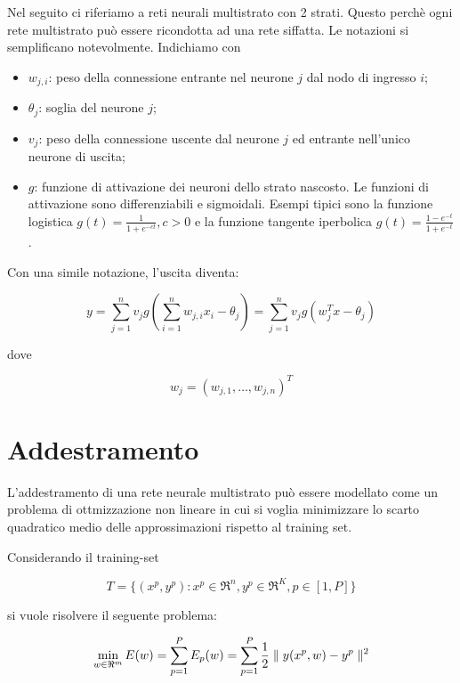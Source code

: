 Nel seguito ci riferiamo a reti neurali multistrato con 2 strati. Questo perchè ogni rete multistrato può essere ricondotta ad una rete siffatta. Le notazioni si semplificano notevolmente. Indichiamo con
\begin{itemize}
  \item $w_{j,i}$: peso della connessione entrante nel neurone $j$ dal nodo di ingresso $i$;
  \item $\theta_{j}$: soglia del neurone $j$;
  \item $v_{j}$: peso della connessione uscente dal neurone $j$ ed entrante nell'unico neurone di uscita;
  \item $g$: funzione di attivazione dei neuroni dello strato nascosto. Le funzioni di attivazione sono differenziabili e sigmoidali. Esempi tipici sono la funzione logistica  $g(t)=\frac{1}{1+e^{-ct}},c>0$ e la funzione tangente iperbolica $g(t)=\frac{1-e^{-t}}{1+e^{-t}}$.
\end{itemize}

Con una simile notazione, l'uscita diventa:

\begin{equation}
\label{eqn:neural-network.multilayered.exit.2}
  y=\sum_{j=1}^{n}v_{j}g(\sum_{i=1}^{n}w_{j,i}x_{i}-\theta_{j})=\sum_{j=1}^{n}v_{j}g(w_{j}^{T}x-\theta_{j})
\end{equation}

dove

\begin{equation}
  w_{j}=(w_{j,1},\ldots,w_{j,n})^{T}
\end{equation}


\section{Addestramento}
\label{sec:neural-networks.multilayered.learning}
L'addestramento di una rete neurale multistrato può essere modellato come un problema di ottmizzazione non lineare in cui si voglia minimizzare lo scarto quadratico medio delle approssimazioni rispetto al training set.

Considerando il training-set

\begin{equation}
\label{eqn:neural-networks.multilayered.trainig-set}
T=\{(x^{p},y^{p}):x^{p}\in\Re^{n},y^{p}\in\Re^{K},p\in[1,P]\}
\end{equation}

si vuole risolvere il seguente problema:

\begin{equation}
  \label{eqn:neural-networks.multilayered.learning.problem}
  \min_{w\in\Re^{m}} E(w)=
  \sum_{p=1}^{P}E_{p}(w)=
  \sum_{p=1}^{P}\frac{1}{2}\parallel y(x^{p},w)-y^{p} \parallel^2
\end{equation}

